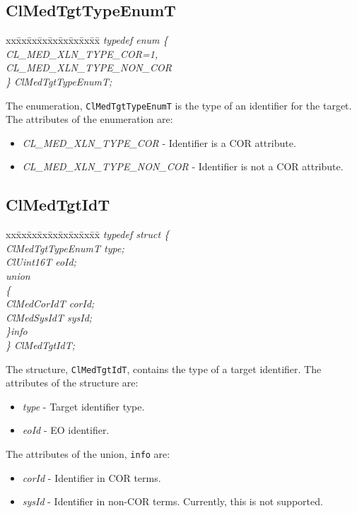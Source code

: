 \begin{flushleft}
\subsection{ClMedTgtTypeEnumT}
\begin{tabbing}
xx\=xx\=xx\=xx\=xx\=xx\=xx\=xx\=xx\=\kill
\textit{typedef enum \{}\\
\>\>\>\>\textit{CL\_MED\_XLN\_TYPE\_COR=1,}\\
\>\>\>\>\textit{CL\_MED\_XLN\_TYPE\_NON\_COR}\\
\textit{\} ClMedTgtTypeEnumT;}\end{tabbing}
The enumeration, {\tt{ClMedTgtTypeEnumT}} is the type of an identifier for the target. The attributes of the enumeration are:
\begin{itemize}
\item
\textit{CL\_\-MED\_\-XLN\_\-TYPE\_\-COR} - Identifier is a COR attribute.
\item
\textit{CL\_\-MED\_\-XLN\_\-TYPE\_\-NON\_\-COR} - Identifier is not a COR attribute.
\end{itemize}


\subsection{ClMedTgtIdT}
\begin{tabbing}
xx\=xx\=xx\=xx\=xx\=xx\=xx\=xx\=xx\=\kill
\textit{typedef struct \{}\\
\>\>\>\>\textit{ClMedTgtTypeEnumT  type;}\\
\>\>\>\>\textit{ClUint16T eoId;}\\
\>\>\>\>\textit{union}\\
\>\>\>\>\textit{\{}\\
\>\>\>\>\>\>\textit{ClMedCorIdT  corId;}\\
\>\>\>\>\>\>\textit{ClMedSysIdT  sysId;}\\
\>\>\>\>\textit{\}info}\\
\textit{\} ClMedTgtIdT;}\end{tabbing}
The structure, {\tt{ClMedTgtIdT}}, contains the type of a target identifier. The attributes of the structure are:
\begin{itemize}
\item
\textit{type} - Target identifier type.
\item
\textit{eoId} - EO identifier.
\end{itemize}
The attributes of the union, {\tt{info}} are:
\begin{itemize}
\item
\textit{corId} - Identifier in COR terms.
\item
\textit{sysId} - Identifier in non-COR terms. Currently, this is not supported.
\end{itemize}




\end{flushleft}
